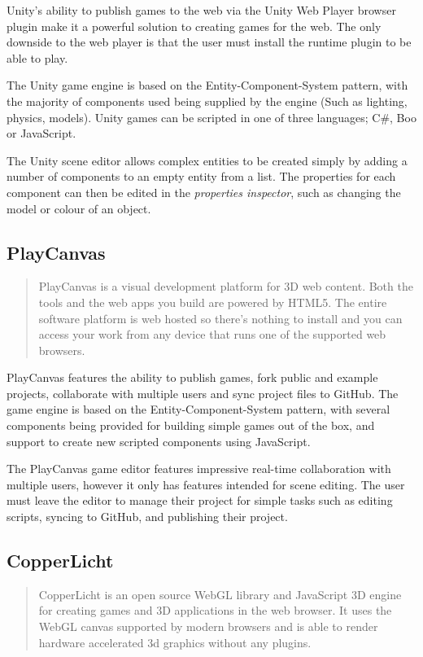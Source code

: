 Unity's ability to publish games to the web via the Unity Web Player browser plugin make it a powerful solution to creating games for the web. The only downside to the web player is that the user must install the runtime plugin to be able to play.\cite{unityweb}

The Unity game engine is based on the Entity-Component-System pattern, with the majority of components used being supplied by the engine (Such as lighting, physics, models).\cite{unitycomponents} Unity games can be scripted in one of three languages; C\#, Boo or JavaScript.

The Unity scene editor allows complex entities to be created simply by adding a number of components to an empty entity from a list. The properties for each component can then be edited in the \emph{properties inspector}, such as changing the model or colour of an object. \cite{unitycreatingscenes}

\subsection{PlayCanvas}
\begin{quote}
PlayCanvas is a visual development platform for 3D web content. Both the tools and the web apps you build are powered by HTML5. The entire software platform is web hosted so there's nothing to install and you can access your work from any device that runs one of the supported web browsers.\cite{playcanvas}
\end{quote}

PlayCanvas features the ability to publish games, fork public and example projects, collaborate with multiple users and sync project files to GitHub. The game engine is based on the Entity-Component-System pattern, with several components being provided for building simple games out of the box, and support to create new scripted components using JavaScript.\cite{playcanvas}

The PlayCanvas game editor features impressive real-time collaboration with multiple users, however it only has features intended for scene editing. The user must leave the editor to manage their project for simple tasks such as editing scripts, syncing to GitHub, and publishing their project.

\subsection{CopperLicht}
\begin{quote}
CopperLicht is an open source WebGL library and JavaScript 3D engine for creating games and 3D applications in the web browser. It uses the WebGL canvas supported by modern browsers and is able to render hardware accelerated 3d graphics without any plugins.\cite{copperlicht}
\end{quote}

